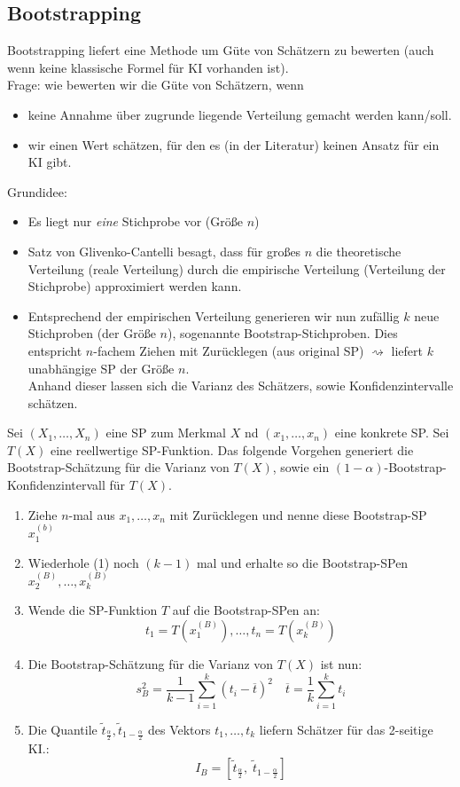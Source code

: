 \documentclass{scrreprt}
\begin{document}
\subsection{Bootstrapping}
Bootstrapping liefert eine Methode um Güte von Schätzern zu bewerten (auch wenn keine klassische Formel für KI vorhanden ist).\\
Frage: wie bewerten wir die Güte von Schätzern, wenn
\begin{itemize}
\item keine Annahme über zugrunde liegende Verteilung gemacht werden kann/soll.
\item wir einen Wert schätzen, für den es (in der Literatur) keinen Ansatz für ein KI gibt.
\end{itemize}
Grundidee:
\begin{itemize}
\item Es liegt nur \emph{eine} Stichprobe vor (Größe $n$)
\item Satz von Glivenko-Cantelli besagt, dass für großes $n$ die theoretische Verteilung (reale Verteilung) durch die empirische Verteilung (Verteilung der Stichprobe) approximiert werden kann.
\item Entsprechend der empirischen Verteilung generieren wir nun zufällig $k$ neue Stichproben (der Größe $n$), sogenannte Bootstrap-Stichproben. Dies entspricht $n$-fachem Ziehen mit Zurücklegen (aus original SP) $\rightsquigarrow$ liefert $k$ unabhängige SP der Größe $n$.\\
Anhand dieser lassen sich die Varianz des Schätzers, sowie Konfidenzintervalle schätzen.
\end{itemize}

 Sei $(X_1, \ldots, X_n)$ eine SP zum Merkmal $X$ nd $(x_1, \ldots, x_n)$ eine konkrete SP. Sei $T(X)$ eine reellwertige SP-Funktion. Das folgende Vorgehen generiert die Bootstrap-Schätzung für die Varianz von $T(X)$, sowie ein $(1-\alpha)$-Bootstrap-Konfidenzintervall für $T(X)$.
\begin{enumerate}
\item Ziehe $n$-mal aus $x_1, \ldots, x_n$ mit Zurücklegen und nenne diese Bootstrap-SP $x_1^{(b)}$
\item Wiederhole (1) noch $(k-1)$ mal und erhalte so die Bootstrap-SPen $x_2^{(B)}, \ldots ,x_k^{(B)}$
\item Wende die SP-Funktion $T$ auf die Bootstrap-SPen an:
$$t_1=T(x_1^{(B)}), \ldots , t_n=T(x_k^{(B)})$$
\item Die Bootstrap-Schätzung für die Varianz von $T(X)$ ist nun:
$$s_B^2=\frac{1}{k-1}\sum_{i=1}^k (t_i-\overline{t})^2\quad \overline{t}=\frac{1}{k}\sum_{i=1}^k t_i$$
\item Die Quantile $\tilde{t}_{\frac{\alpha}{2}}, \tilde{t}_{1-\frac{\alpha}{2}}$ des Vektors $t_1, \ldots, t_k$ liefern Schätzer für das 2-seitige KI.:
$$I_B=[\tilde{t}_{\frac{\alpha}{2}},\; \tilde{t}_{1-\frac{\alpha}{2}}]$$
\end{enumerate}
\end{document}
